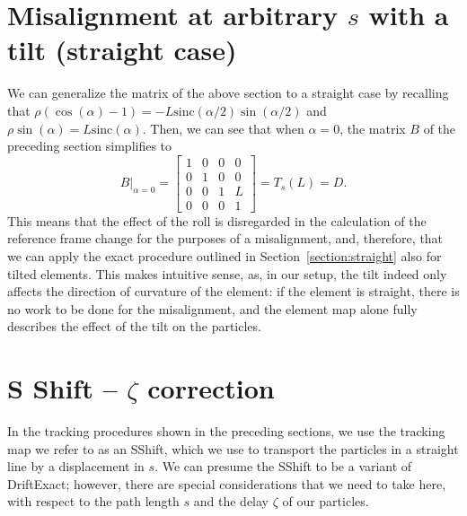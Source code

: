 \section{Misalignment at arbitrary $s$ with a tilt (straight case)}\label{section:straight-roll}

We can generalize the matrix of the above section to a straight case by recalling that $\rho(\cos(\alpha) - 1) = -L \mathrm{sinc}(\alpha / 2) \sin(\alpha / 2)$ and $\rho \sin(\alpha) = L \mathrm{sinc}(\alpha)$.
Then, we can see that when $\alpha = 0$, the matrix $B$ of the preceding section simplifies to
\[
	B \rvert_{\alpha=0} = \begin{bmatrix}
		1 & 0 & 0 & 0 \\
		0 & 1 & 0 & 0 \\
		0 & 0 & 1 & L \\
		0 & 0 & 0 & 1
	\end{bmatrix} = T_s(L) = D.
\]
This means that the effect of the roll is disregarded in the calculation of the reference frame change for the purposes of a misalignment, and, therefore, that we can apply the exact procedure outlined in Section~\ref{section:straight} also for tilted elements.
This makes intuitive sense, as, in our setup, the tilt indeed only affects the direction of curvature of the element: if the element is straight, there is no work to be done for the misalignment, and the element map alone fully describes the effect of the tilt on the particles.


\section{S Shift -- $\zeta$ correction}

In the tracking procedures shown in the preceding sections, we use the tracking map we refer to as an SShift, which we use to transport the particles in a straight line by a displacement in $s$.
We can presume the SShift to be a variant of DriftExact; however, there are special considerations that we need to take here, with respect to the path length $s$ and the delay $\zeta$ of our particles.

